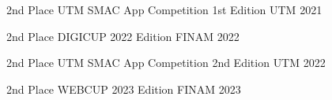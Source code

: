 



\begin{cvhonors}

  \cvhonor
    {2nd Place} %
    {UTM SMAC App Competition 1st Edition} %
    {UTM} %
    {2021} %

  \cvhonor
    {2nd Place} %
    {DIGICUP 2022 Edition} %
    {FINAM} %
    {2022} %

  \cvhonor
    {2nd Place} %
    {UTM SMAC App Competition 2nd Edition} %
    {UTM} %
    {2022} %

  \cvhonor
    {2nd Place} %
    {WEBCUP 2023 Edition} %
    {FINAM} %
    {2023} %

\end{cvhonors}
